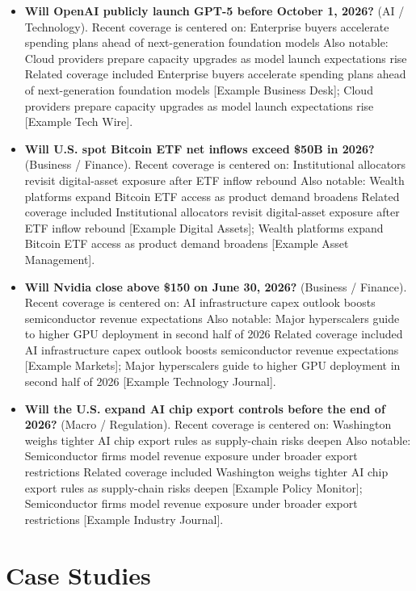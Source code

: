 \documentclass[12pt]{article}
\begin{document}
\begin{itemize}
\item \textbf{Will OpenAI publicly launch GPT-5 before October 1, 2026?} (AI / Technology). Recent coverage is centered on: Enterprise buyers accelerate spending plans ahead of next-generation foundation models Also notable: Cloud providers prepare capacity upgrades as model launch expectations rise Related coverage included Enterprise buyers accelerate spending plans ahead of next-generation foundation models [Example Business Desk]; Cloud providers prepare capacity upgrades as model launch expectations rise [Example Tech Wire].
\item \textbf{Will U.S. spot Bitcoin ETF net inflows exceed \$50B in 2026?} (Business / Finance). Recent coverage is centered on: Institutional allocators revisit digital-asset exposure after ETF inflow rebound Also notable: Wealth platforms expand Bitcoin ETF access as product demand broadens Related coverage included Institutional allocators revisit digital-asset exposure after ETF inflow rebound [Example Digital Assets]; Wealth platforms expand Bitcoin ETF access as product demand broadens [Example Asset Management].
\item \textbf{Will Nvidia close above \$150 on June 30, 2026?} (Business / Finance). Recent coverage is centered on: AI infrastructure capex outlook boosts semiconductor revenue expectations Also notable: Major hyperscalers guide to higher GPU deployment in second half of 2026 Related coverage included AI infrastructure capex outlook boosts semiconductor revenue expectations [Example Markets]; Major hyperscalers guide to higher GPU deployment in second half of 2026 [Example Technology Journal].
\item \textbf{Will the U.S. expand AI chip export controls before the end of 2026?} (Macro / Regulation). Recent coverage is centered on: Washington weighs tighter AI chip export rules as supply-chain risks deepen Also notable: Semiconductor firms model revenue exposure under broader export restrictions Related coverage included Washington weighs tighter AI chip export rules as supply-chain risks deepen [Example Policy Monitor]; Semiconductor firms model revenue exposure under broader export restrictions [Example Industry Journal].
\end{itemize}

\section{Case Studies}
\end{document}
